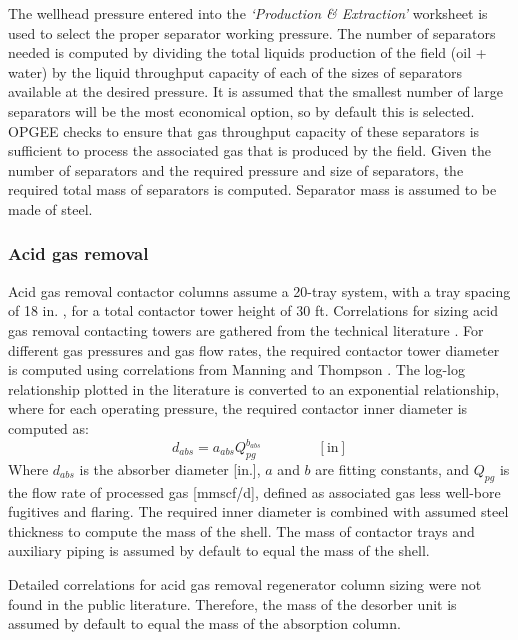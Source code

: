 \documentclass[11pt]{report}
\newcommand{\sheet}[1]{\textit{`{#1}'}}
\newcommand{\eqnunit}[1]{\quad\quad \scriptstyle{\left[\text{#1}\right]}}
\begin{document}
The wellhead pressure entered into the \sheet{Production \& Extraction} worksheet  is used to select the proper separator working pressure. The number of separators needed is computed by dividing the total liquids production of the field (oil + water) by the liquid throughput capacity of each of the sizes of separators available at the desired pressure.  It is assumed that the smallest number of large separators will be the most economical option, so by default this is selected. OPGEE checks to ensure that gas throughput capacity of these separators is sufficient to process the associated gas that is produced by the field.  Given the number of separators and the required pressure and size of separators, the required total mass of separators is computed. Separator mass is assumed to be made of steel.

\subsubsection{Acid gas removal}

Acid gas  removal contactor columns assume a 20-tray system, with a tray spacing of 18 in. \cite[p.116]{Manning1991}, for a total contactor tower height of 30 ft. Correlations for sizing acid gas removal contacting towers are gathered from the technical literature \cite{Manning1991}. For different gas pressures and gas flow rates, the required contactor tower diameter is  computed using correlations from Manning and Thompson \cite{Manning1991}. The log-log relationship plotted in the literature is converted to an exponential relationship, where for each operating pressure, the required contactor inner diameter is computed as:
\begin{equation}
d_{abs} = a_{abs} Q_{pg}^{b_{abs}} \quad\quad\eqnunit{in}
\end{equation}
Where $d_{abs}$ is the absorber diameter [in.], $a$ and $b$ are fitting constants, and $Q_{pg}$ is the flow rate of processed gas  [mmscf/d], defined as associated gas less well-bore fugitives and flaring. The required inner diameter is combined with assumed steel thickness  to compute the mass of the shell. The mass of contactor trays and auxiliary piping is assumed by default to equal the mass of the shell. 

Detailed correlations for acid gas removal regenerator column sizing were not found in the public literature. Therefore, the mass of the desorber unit is assumed by default to equal the mass of the absorption column.
\end{document}
